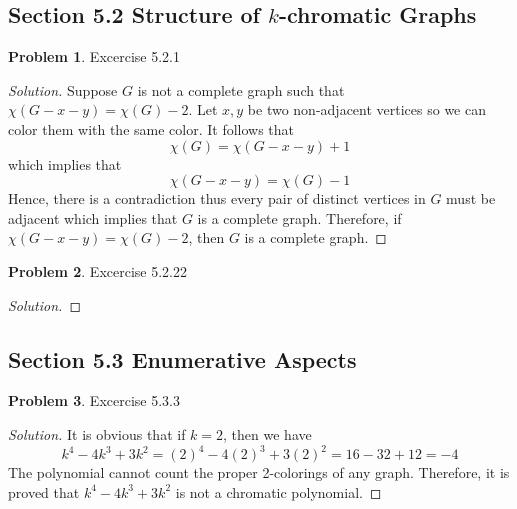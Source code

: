 \documentclass[12pt]{article}
\theoremstyle{definition}
\newtheorem{problem}{Problem}
\newenvironment*{solution}{\begin{proof}[Solution]}{\end{proof}}
\begin{document}
\subsection*{Section 5.2 Structure of \(k\)-chromatic Graphs}
\begin{problem}
    Excercise 5.2.1
\end{problem}
\begin{solution}
    Suppose \(G\) is not a complete graph such that
    \(\chi(G-x-y) = \chi(G)-2\).
    Let \(x,y\) be two non-adjacent vertices so we can color them with the
    same color.
    It follows that \[\chi(G) = \chi(G-x-y)+1\] which implies that
    \[\chi(G-x-y) = \chi(G)-1\]
    Hence, there is a contradiction thus every pair of distinct vertices in
    \(G\) must be adjacent which implies that \(G\) is a complete graph.
    Therefore, if \(\chi(G-x-y) = \chi(G)-2\), then \(G\) is a complete graph.
\end{solution}

\begin{problem}
    Excercise 5.2.22
\end{problem}
\begin{solution}
    
\end{solution}

\subsection*{Section 5.3 Enumerative Aspects}
\begin{problem}
    Excercise 5.3.3
\end{problem}
\begin{solution}
    It is obvious that if \(k=2\), then we have
    \[k^4-4k^3+3k^2 = (2)^4-4(2)^3+3(2)^2 = 16-32+12 = -4\]
    The polynomial cannot count the proper 2-colorings of any graph.
    Therefore, it is proved that \(k^4-4k^3+3k^2\) is not a chromatic
    polynomial.
\end{solution}
\end{document}
